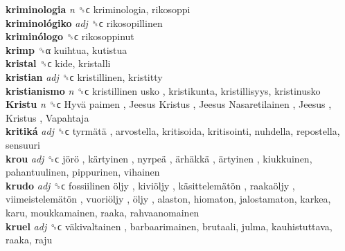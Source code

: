 \textbf{kriminologia} \emph{n}  ␝ϲ  kriminologia, rikosoppi  \\
\textbf{kriminológiko} \emph{adj}  ␝ϲ  rikosopillinen  \\
\textbf{kriminólogo} ␝ϲ  rikosoppinut  \\
\textbf{krimp} ␝α  kuihtua, kutistua  \\
\textbf{kristal} ␝ϲ  kide, kristalli  \\
\textbf{kristian} \emph{adj}  ␝ϲ  kristillinen, kristitty  \\
\textbf{kristianismo} \emph{n}  ␝ϲ   kristillinen usko , kristikunta, kristillisyys, kristinusko  \\
\textbf{Kristu} \emph{n}  ␝ϲ   Hyvä paimen ,  Jeesus Kristus ,  Jeesus Nasaretilainen ,  Jeesus ,  Kristus ,  Vapahtaja   \\
\textbf{kritiká} \emph{adj}  ␝ϲ   tyrmätä , arvostella, kritisoida, kritisointi, nuhdella, repostella, sensuuri  \\
\textbf{krou} \emph{adj}  ␝ϲ   jörö ,  kärtyinen ,  nyrpeä ,  ärhäkkä ,  ärtyinen , kiukkuinen, pahantuulinen, pippurinen, vihainen  \\
\textbf{krudo} \emph{adj}  ␝ϲ   fossiilinen öljy ,  kiviöljy ,  käsittelemätön ,  raakaöljy ,  viimeistelemätön ,  vuoriöljy ,  öljy , alaston, hiomaton, jalostamaton, karkea, karu, moukkamainen, raaka, rahvaanomainen  \\
\textbf{kruel} \emph{adj}  ␝ϲ   väkivaltainen , barbaarimainen, brutaali, julma, kauhistuttava, raaka, raju  \\
